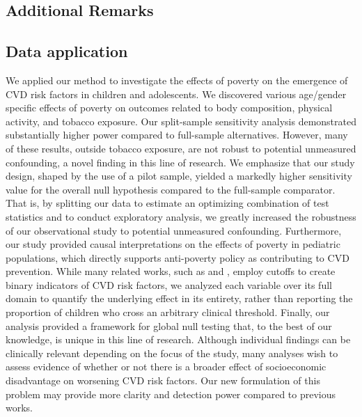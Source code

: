 \documentclass[12pt,leqno,titlepage]{amsart}
\newcommand{\1}{\mathbbm{1}}
\begin{document}
\begin{bibunit}





\section{Additional Remarks} \label{sec: discussion}

\subsection{Data application}
We applied our method to investigate the effects of poverty on the emergence of CVD risk factors in children and adolescents. We discovered various age/gender specific effects of poverty on outcomes related to body composition, physical activity, and tobacco exposure. Our split-sample sensitivity analysis demonstrated substantially higher power compared to full-sample alternatives. However, many of these results, outside tobacco exposure, are not robust to potential unmeasured confounding, a novel finding in this line of research. We emphasize that our study design, shaped by the use of a pilot sample, yielded a markedly higher sensitivity value for the overall null hypothesis compared to the full-sample comparator. That is, by splitting our data to estimate an optimizing combination of test statistics and to conduct exploratory analysis, we greatly increased the robustness of our observational study to potential unmeasured confounding. Furthermore, our study 
provided causal interpretations on the effects of poverty in pediatric populations, which directly supports anti-poverty policy as contributing to CVD prevention. While many related works, such as \cite{ali2011household} and \cite{jackson2018income}, employ cutoffs to create binary indicators of CVD risk factors, we analyzed each variable over its full domain to quantify the underlying effect in its entirety, rather than reporting the proportion of children who cross an arbitrary clinical threshold. Finally, our analysis provided a framework for global null testing that, to the best of our knowledge, is unique in this line of research. Although individual findings can be clinically relevant depending on the focus of the study, many analyses wish to assess evidence of whether or not there is a broader effect of socioeconomic disadvantage on worsening CVD risk factors. Our new formulation of this problem may provide more clarity and detection power compared to previous works.



\end{bibunit}
\end{document}
